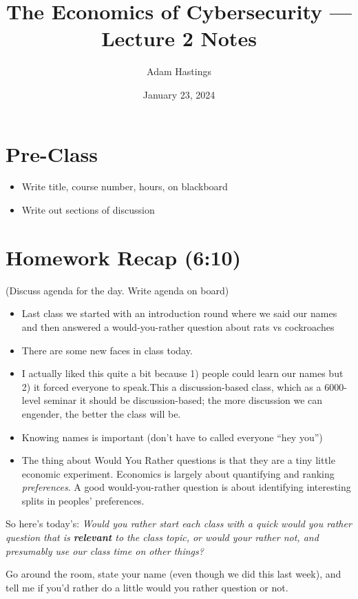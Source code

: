 \documentclass[11pt]{article}
\title{The Economics of Cybersecurity --- Lecture 2 Notes}
\date{January 23, 2024}
\author{Adam Hastings}
\begin{document}
\maketitle

\section*{Pre-Class}
\begin{itemize}
    \item Write title, course number, hours, on blackboard
    \item Write out sections of discussion
\end{itemize}

\section{Homework Recap (6:10)} 

(Discuss agenda for the day. Write agenda on board)

\begin{itemize}
    \item Last class we started with an introduction round where we said our names and then answered a would-you-rather question about rats vs cockroaches
    \item There are some new faces in class today.
    \item I actually liked this quite a bit because 1) people could learn our names but 2) it forced everyone to speak.This a discussion-based class, which as a 6000-level seminar it should be discussion-based; the more discussion we can engender, the better the class will be. 
    \item Knowing names is important (don't have to called everyone ``hey you'')
    \item The thing about Would You Rather questions is that they are a tiny little economic experiment. Economics is largely about quantifying and ranking {\it preferences}. A good would-you-rather question is about identifying interesting splits in peoples' preferences.  
\end{itemize}

So here's today's: {\it Would you rather start each class with a quick would you rather question that is {\bf relevant} to the class topic, or would your rather not, and presumably use our class time on other things?}

Go around the room, state your name (even though we did this last week), and tell me if you'd rather do a little would you rather question or not.
\end{document}
